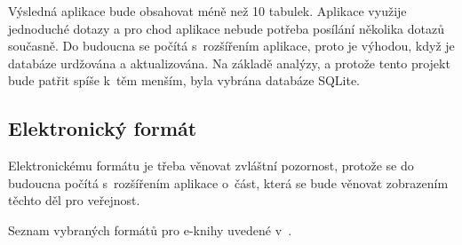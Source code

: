         Výsledná aplikace bude obsahovat méně než 10 tabulek. Aplikace využije jednoduché dotazy a pro chod aplikace nebude potřeba posílání několika dotazů současně. Do budoucna se počítá s~rozšířením aplikace, proto je výhodou, když je databáze urdžována a aktualizována. Na základě analýzy, a protože tento projekt bude patřit spíše k~těm menším, byla vybrána databáze SQLite.
        
        \subsection{Elektronický formát}
            \cite{electronic-format}
            
            Elektronickému formátu je třeba věnovat zvláštní pozornost, protože se do budoucna počítá s~rozšířením aplikace o~část, která se bude věnovat zobrazením těchto děl pro veřejnost.
            
            Seznam vybraných formátů pro e-knihy uvedené v~\cite{electronic-format}.
            
